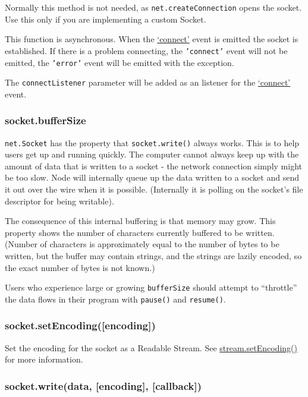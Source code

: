 Normally this method is not needed, as \texttt{net.createConnection}
opens the socket. Use this only if you are implementing a custom Socket.

This function is asynchronous. When the
\hyperref[netux5feventux5fconnect]{`connect'} event is emitted the
socket is established. If there is a problem connecting, the
\texttt{'connect'} event will not be emitted, the \texttt{'error'} event
will be emitted with the exception.

The \texttt{connectListener} parameter will be added as an listener for
the \hyperref[netux5feventux5fconnect]{`connect'} event.

\subsubsection{socket.bufferSize}\label{socket.buffersize}

\texttt{net.Socket} has the property that \texttt{socket.write()} always
works. This is to help users get up and running quickly. The computer
cannot always keep up with the amount of data that is written to a
socket - the network connection simply might be too slow. Node will
internally queue up the data written to a socket and send it out over
the wire when it is possible. (Internally it is polling on the socket's
file descriptor for being writable).

The consequence of this internal buffering is that memory may grow. This
property shows the number of characters currently buffered to be
written. (Number of characters is approximately equal to the number of
bytes to be written, but the buffer may contain strings, and the strings
are lazily encoded, so the exact number of bytes is not known.)

Users who experience large or growing \texttt{bufferSize} should attempt
to ``throttle'' the data flows in their program with \texttt{pause()}
and \texttt{resume()}.

\subsubsection{socket.setEncoding({[}encoding{]})}\label{socket.setencodingencoding}

Set the encoding for the socket as a Readable Stream. See
\href{stream.html\#stream_stream_setencoding_encoding}{stream.setEncoding()}
for more information.

\subsubsection{socket.write(data, {[}encoding{]},
{[}callback{]})}\label{socket.writedata-encoding-callback}

